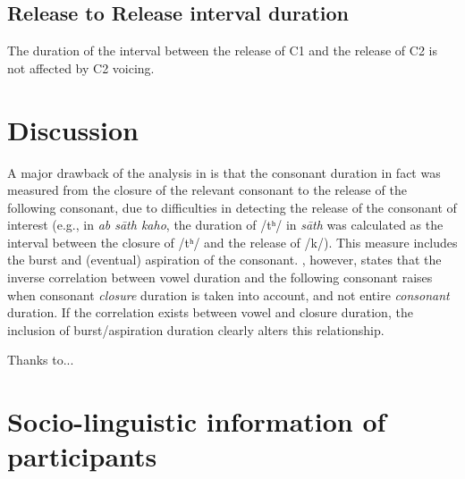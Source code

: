 \documentclass[]{JASAnew}
\begin{document}
\hypertarget{release-to-release-interval-duration}{%
\subsection{Release to Release interval
duration}\label{release-to-release-interval-duration}}

The duration of the interval between the release of C1 and the release
of C2 is not affected by C2 voicing.

\hypertarget{discussion}{%
\section{Discussion}\label{discussion}}

A major drawback of the analysis in \citet{maddieson1976} is that the
consonant duration in fact was measured from the closure of the relevant
consonant to the release of the following consonant, due to difficulties
in detecting the release of the consonant of interest (e.g., in \emph{ab
sāth kaho}, the duration of /tʰ/ in \emph{sāth} was calculated as the
interval between the closure of /tʰ/ and the release of /k/). This
measure includes the burst and (eventual) aspiration of the consonant.
\citet{slis1969a}, however, states that the inverse correlation between
vowel duration and the following consonant raises when consonant
\emph{closure} duration is taken into account, and not entire
\emph{consonant} duration. If the correlation exists between vowel and
closure duration, the inclusion of burst/aspiration duration clearly
alters this relationship.

\begin{acknowledgments}
Thanks to...
\end{acknowledgments}

\appendix

\section{Socio-linguistic information of participants}
\label{a:socioling}
\end{document}
